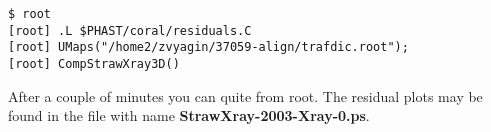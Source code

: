 \documentclass[a4paper,12pt]{article}
\begin{document}
\begin{verbatim}
$ root
[root] .L $PHAST/coral/residuals.C
[root] UMaps("/home2/zvyagin/37059-align/trafdic.root");
[root] CompStrawXray3D()
\end{verbatim}

After a couple of minutes you can quite from root. The residual plots
may be found in the file with name {\bf StrawXray-2003-Xray-0.ps}.





\end{document}
